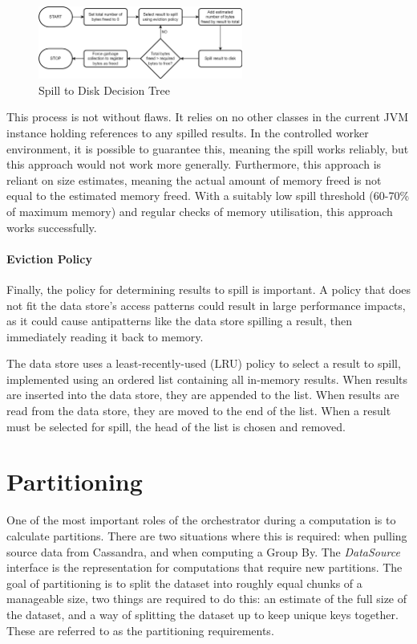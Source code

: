 \begin{figure}[h]
	\centering
	\includegraphics[width=0.6\textwidth]{chapters/diagrams/implementation/spill-to-disk-process}
	\caption{Spill to Disk Decision Tree}
	\label{fig:spill-to-disk-process}
\end{figure}

This process is not without flaws. It relies on no other classes in the current JVM instance holding references to any spilled results. In the controlled worker environment, it is possible to guarantee this, meaning the spill works reliably, but this approach would not work more generally. Furthermore, this approach is reliant on size estimates, meaning the actual amount of memory freed is not equal to the estimated memory freed. With a suitably low spill threshold (60-70\% of maximum memory) and regular checks of memory utilisation, this approach works successfully.

\paragraph{Eviction Policy}
Finally, the policy for determining results to spill is important. A policy that does not fit the data store's access patterns could result in large performance impacts, as it could cause antipatterns like the data store spilling a result, then immediately reading it back to memory.

The data store uses a least-recently-used (LRU) policy to select a result to spill, implemented using an ordered list containing all in-memory results. When results are inserted into the data store, they are appended to the list. When results are read from the data store, they are moved to the end of the list. When a result must be selected for spill, the head of the list is chosen and removed.



\section{Partitioning}
One of the most important roles of the orchestrator during a computation is to calculate partitions. There are two situations where this is required: when pulling source data from Cassandra, and when computing a Group By. The \textit{DataSource} interface is the representation for computations that require new partitions. The goal of partitioning is to split the dataset into roughly equal chunks of a manageable size, two things are required to do this: an estimate of the full size of the dataset, and a way of splitting the dataset up to keep unique keys together. These are referred to as the partitioning requirements.

